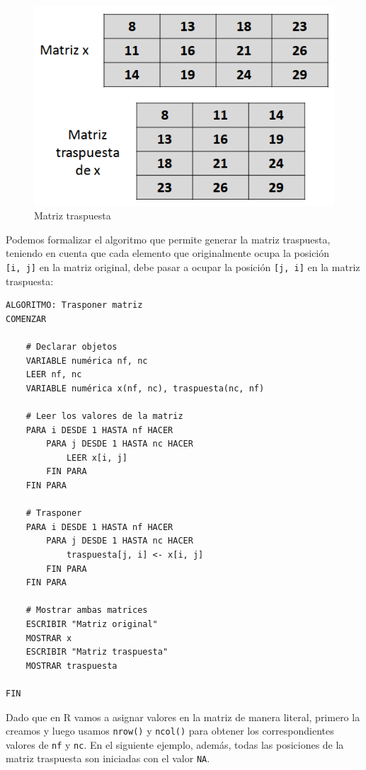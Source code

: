 \documentclass[
]{book}
\begin{document}
\begin{figure}

{\centering \includegraphics[width=0.8\linewidth]{images/05_estructuras/estr14} 

}

\caption{Matriz traspuesta}\label{fig:unnamed-chunk-127}
\end{figure}

Podemos formalizar el algoritmo que permite generar la matriz traspuesta, teniendo en cuenta que cada elemento que originalmente ocupa la posición \texttt{{[}i,\ j{]}} en la matriz original, debe pasar a ocupar la posición \texttt{{[}j,\ i{]}} en la matriz traspuesta:

\begin{verbatim}
ALGORITMO: Trasponer matriz
COMENZAR
    
    # Declarar objetos
    VARIABLE numérica nf, nc
    LEER nf, nc
    VARIABLE numérica x(nf, nc), traspuesta(nc, nf)
    
    # Leer los valores de la matriz
    PARA i DESDE 1 HASTA nf HACER
        PARA j DESDE 1 HASTA nc HACER
            LEER x[i, j]
        FIN PARA
    FIN PARA
    
    # Trasponer
    PARA i DESDE 1 HASTA nf HACER
        PARA j DESDE 1 HASTA nc HACER
            traspuesta[j, i] <- x[i, j]
        FIN PARA
    FIN PARA
    
    # Mostrar ambas matrices
    ESCRIBIR "Matriz original"
    MOSTRAR x
    ESCRIBIR "Matriz traspuesta"
    MOSTRAR traspuesta
    
FIN
\end{verbatim}

Dado que en R vamos a asignar valores en la matriz de manera literal, primero la creamos y luego usamos \texttt{nrow()} y \texttt{ncol()} para obtener los correspondientes valores de \texttt{nf} y \texttt{nc}. En el siguiente ejemplo, además, todas las posiciones de la matriz traspuesta son iniciadas con el valor \texttt{NA}.
\end{document}
